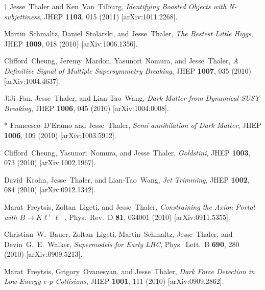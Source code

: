 \documentclass[11pt]{article}
\renewcommand{\bibitem}[1]{\item}
\begin{document}
\begin{list}{[]\addtocounter{jessecount}{-1}}{\leftmargin=3em \itemsep=4pt}
\bibitem{Thaler:2010tr}
  $\dagger$ Jesse~Thaler and Ken~Van~Tilburg,
  \emph{Identifying Boosted Objects with N-subjettiness},
  JHEP {\bf 1103}, 015 (2011)
  [arXiv:1011.2268].

\bibitem{Schmaltz:2010ac}
  Martin~Schmaltz, Daniel~Stolarski, and Jesse~Thaler,
  \emph{The Bestest Little Higgs},
  JHEP {\bf 1009}, 018 (2010)
  [arXiv:1006.1356].
  
\bibitem{Cheung:2010qf}
  Clifford~Cheung, Jeremy~Mardon, Yasunori~Nomura, and Jesse~Thaler,
  \emph{A Definitive Signal of Multiple Supersymmetry Breaking},
  JHEP {\bf 1007}, 035 (2010)
  [arXiv:1004.4637].
  
\bibitem{Fan:2010is}
  JiJi~Fan, Jesse~Thaler, and Lian-Tao~Wang,
  \emph{Dark Matter from Dynamical SUSY Breaking},
  JHEP {\bf 1006}, 045 (2010)
  [arXiv:1004.0008].
  
\bibitem{D'Eramo:2010ep}
  * Francesco~D'Eramo and Jesse~Thaler,
  \emph{Semi-annihilation of Dark Matter},
  JHEP {\bf 1006}, 109 (2010)
  [arXiv:1003.5912].
  
\bibitem{Cheung:2010mc}
  Clifford~Cheung, Yasunori~Nomura, and Jesse~Thaler,
  \emph{Goldstini},
  JHEP {\bf 1003}, 073 (2010)
  [arXiv:1002.1967].
  
\bibitem{Krohn:2009th}
  David~Krohn, Jesse~Thaler, and Lian-Tao~Wang,
  \emph{Jet Trimming},
  JHEP {\bf 1002}, 084 (2010)
  [arXiv:0912.1342].
  
\bibitem{Freytsis:2009ct}
  Marat~Freytsis, Zoltan~Ligeti, and Jesse~Thaler,
  \emph{Constraining the Axion Portal with $B \to K \ell^+ \ell^-$},
  Phys.\ Rev.\  D {\bf 81}, 034001 (2010)
  [arXiv:0911.5355].
  
\bibitem{Bauer:2009cc}
  Christian~W.~Bauer, Zoltan~Ligeti, Martin~Schmaltz, Jesse~Thaler, and Devin~G.~E.~Walker,
  \emph{Supermodels for Early LHC},
  Phys.\ Lett.\  B {\bf 690}, 280 (2010)
  [arXiv:0909.5213].
  
\bibitem{Freytsis:2009bh}
  Marat~Freytsis, Grigory~Ovanesyan, and Jesse~Thaler,
  \emph{Dark Force Detection in Low Energy e-p Collisions},
  JHEP {\bf 1001}, 111 (2010)
  [arXiv:0909.2862].
  

\end{list}
\end{document}
